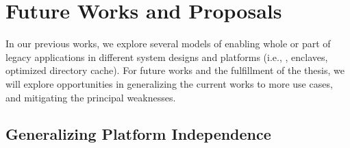 \chapter{Future Works and Proposals}
\label{chap:future}



In our previous works, we explore several models of enabling
whole or part of legacy applications
in different system designs and platforms
(i.e., \liboses{}, \sgx{} enclaves, optimized directory cache).
For future works and the fulfillment of the thesis,
we will explore
opportunities in generalizing the current works to more use cases,
and mitigating the principal weaknesses.




\section{Generalizing Platform Independence}
\label{sec:future:independence}

